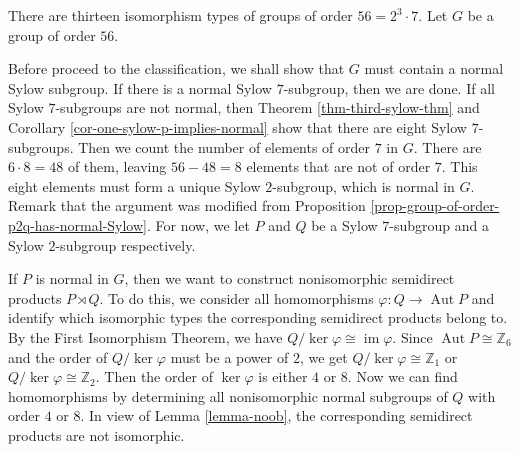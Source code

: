\begin{example}
	There are thirteen isomorphism types of groups of order $56 = 2^3\cdot 7$. Let $G$ be a group of order $56$. 
	
	
Before proceed to the classification, we shall show that $G$ must contain a normal Sylow subgroup. If there is a normal Sylow $7$-subgroup, then we are done. If all Sylow $7$-subgroups are not normal, then Theorem \ref{thm-third-sylow-thm} and Corollary \ref{cor-one-sylow-p-implies-normal} show that there are eight Sylow $7$-subgroups. Then we count the number of elements of order $7$ in $G$. There  are $6\cdot 8  =48$ of them, leaving $56-48= 8$ elements that are not of order $7$. This eight elements must form a unique Sylow $2$-subgroup, which is normal in $G$. Remark that the argument was modified from Proposition \ref{prop-group-of-order-p2q-has-normal-Sylow}. For now, we let $P$ and $Q$ be a Sylow $7$-subgroup and a Sylow $2$-subgroup respectively. %
	
If  $P$ is normal in $G$, then we want to construct nonisomorphic semidirect products $P\rtimes Q$. To do this, we consider all homomorphisms $\varphi:Q\rightarrow \operatorname{Aut}P$ and identify which isomorphic types the corresponding semidirect products belong to. By the First Isomorphism Theorem, we have
	$
	Q/\operatorname{ker} \varphi \cong \operatorname{im} \varphi
	$.
	Since $\operatorname{Aut} P\cong \mathbb{Z}_6$ and the order of $Q/\operatorname{ker}\varphi$ must be a power of $2$, we get $Q/\operatorname{ker}\varphi\cong \mathbb{Z}_1$ or $Q/\operatorname{ker}\varphi\cong \mathbb{Z}_2$.  Then the order of $\ker \varphi$ is either $4$ or $8$. Now we can find homomorphisms by determining all nonisomorphic normal subgroups of $Q$ with order $4$ or $8$. In view of Lemma \ref{lemma-noob}, the corresponding semidirect products are not isomorphic.
	

\end{example}
